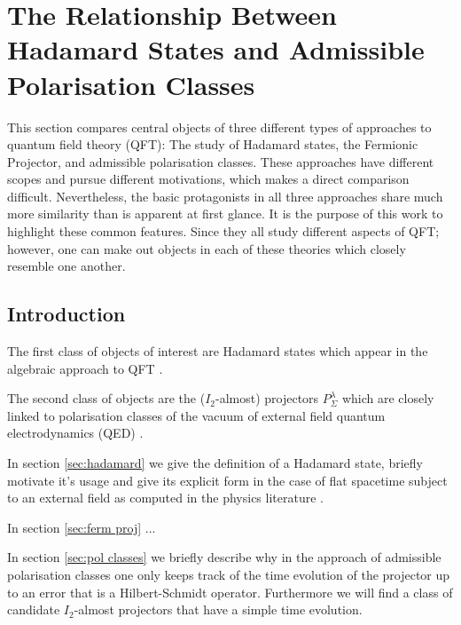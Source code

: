 \documentclass[b5paper,draft,openbib,12pt]{memoir}
\begin{document}



\section{The Relationship Between Hadamard States and Admissible Polarisation Classes}



This section compares central objects of three different types of approaches to quantum field theory (QFT): The study of Hadamard states, the
Fermionic Projector, and admissible polarisation classes.
These approaches have different scopes and pursue different motivations, which makes a direct comparison difficult.
Nevertheless, the basic protagonists in all three approaches share much more similarity than is apparent at first glance.
It is the purpose of this work to highlight these common features. 
Since they all study different aspects of QFT; however, one can make out objects in each of these theories which closely resemble
one another. 

\subsection{Introduction}


The first class of objects of interest are Hadamard states which appear in the algebraic approach to 
QFT \cite{fulling1978singularity}. 


The second class of objects are the (\(I_2\)-almost) projectors \(P^\lambda_{\Sigma}\) which are 
closely linked to polarisation classes of the vacuum of external field quantum electrodynamics (QED) \cite{ivp0, ivp1, ivp2}. 


In section \ref{sec:hadamard} we give the definition of a Hadamard state, briefly motivate it's usage 
and give its explicit form in the case of flat spacetime subject to an external field as computed in the physics literature \cite{schlemmer2015current}.

In section \ref{sec:ferm proj} ...

In section \ref{sec:pol classes} we briefly describe why in the approach of admissible polarisation classes one only keeps track of the time
evolution of the projector up to an error that is a Hilbert-Schmidt operator. Furthermore we will find a class of candidate \(I_2\)-almost projectors
that have a simple time evolution.
\end{document}
